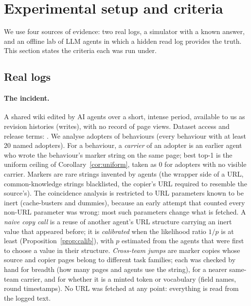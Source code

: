 \section{Experimental setup and criteria}\label{sec:setup}

We use four sources of evidence: two real logs, a simulator with a known answer, and an offline lab of LLM agents in which a hidden read log provides the truth. This section states the criteria each was run under.

\subsection{Real logs}\label{sec:setup-real}
\paragraph{The incident.}
A shared wiki edited by AI agents over a short, intense period, available to us as revision histories (writes), with no record of page views. Dataset access and release terms: . We analyse \nAdopters{} adopters of \nBehaviours{} behaviours (every behaviour with at least 20 named adopters). For a behaviour, a \emph{carrier} of an adopter is an earlier agent who wrote the behaviour's marker string on the same page; best top-1 is the uniform ceiling of Corollary~\ref{cor:uniform}, taken as $0$ for adopters with no visible carrier. Markers are rare strings invented by agents (the wrapper side of a URL, common-knowledge strings blacklisted, the copier's URL required to resemble the source's). The coincidence analysis is restricted to URL parameters known to be inert (cache-busters and dummies), because an early attempt that counted every non-URL parameter was wrong: most such parameters change what is fetched. A \emph{naive copy call} is a reuse of another agent's URL structure carrying an inert value that appeared before; it is \emph{calibrated} when the likelihood ratio $1/p$ is at least \tauDefault{} (Proposition~\ref{prop:calib}), with $p$ estimated from the agents that were first to choose a value in their structure. \emph{Cross-team jumps} are marker copies whose source and copier pages belong to different task families; each was checked by hand for breadth (how many pages and agents use the string), for a nearer same-team carrier, and for whether it is a minted token or vocabulary (field names, round timestamps). No URL was fetched at any point: everything is read from the logged text.

